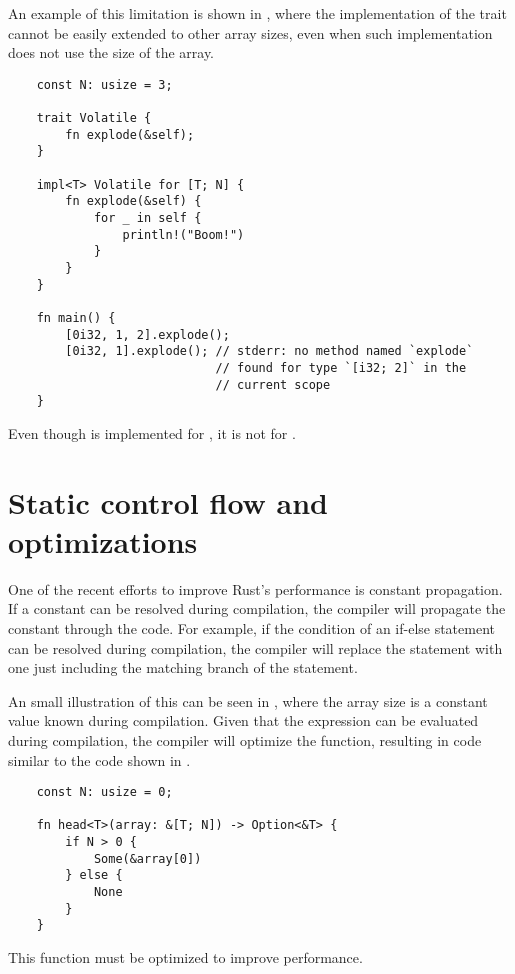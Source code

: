 An example of this limitation is shown in , where the
implementation of the trait  cannot be easily extended to
other array sizes, even when such implementation does not use the size of the
array. 

\begin{listing}
	\begin{verbatim} 
    const N: usize = 3;

    trait Volatile {
        fn explode(&self);
    }

    impl<T> Volatile for [T; N] {
        fn explode(&self) {
            for _ in self {
                println!("Boom!")
            }
        }
    }

    fn main() {
        [0i32, 1, 2].explode(); 
        [0i32, 1].explode(); // stderr: no method named `explode` 
                             // found for type `[i32; 2]` in the
                             // current scope
    }
	\end{verbatim}
    \caption{Even though  is implemented for \inrust{[T; 3]}, it is not for \inrust{[T; 2]}.}
  \label{lst:trait_array}
\end{listing}

\section{Static control flow and optimizations}
One of the recent efforts to improve Rust's performance is constant
propagation. If a constant can be resolved during compilation, the compiler
will propagate the constant through the code. For example, if the condition of
an if-else statement can be resolved during compilation, the compiler will
replace the statement with one just including the matching branch of the
statement.

An small illustration of this can be seen in ,
where the array size  is a constant value known during compilation.
Given that the expression   can be evaluated during compilation,
the compiler will optimize the function, resulting in code similar to the code
shown in .

\begin{listing}
    \begin{verbatim}
    const N: usize = 0;

    fn head<T>(array: &[T; N]) -> Option<&T> {
        if N > 0 {
            Some(&array[0])
        } else {
            None
        }
    }
    \end{verbatim}
    \caption{This function must be optimized to improve performance.}
    \label{lst:static_control_flow}
\end{listing}

